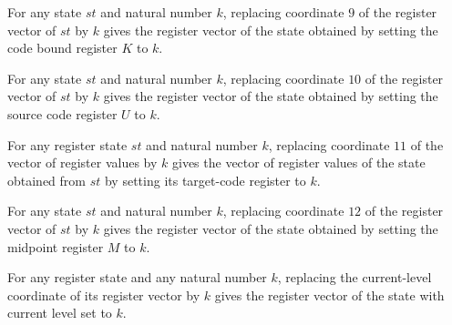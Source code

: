 \begin{lemma}
\label{Complexity.LogProg.SavitchARM.St.upd_K}
\leanok
{}
For any state $st$ and natural number $k$, replacing coordinate $9$ of the register
vector of $st$ by $k$ gives the register vector of the state obtained by setting the
code bound register $K$ to $k$.
\end{lemma}

\begin{lemma}
\label{Complexity.LogProg.SavitchARM.St.upd_U}
\leanok
{}
For any state $st$ and natural number $k$, replacing coordinate $10$ of the register
vector of $st$ by $k$ gives the register vector of the state obtained by setting the
source code register $U$ to $k$.
\end{lemma}

\begin{lemma}
\label{Complexity.LogProg.SavitchARM.St.upd_V}
\leanok
{}
For any register state $st$ and natural number $k$, replacing coordinate $11$ of the
vector of register values by $k$ gives the vector of register values of the state
obtained from $st$ by setting its target-code register to $k$.
\end{lemma}

\begin{lemma}
\label{Complexity.LogProg.SavitchARM.St.upd_M}
\leanok
{}
For any state $st$ and natural number $k$, replacing coordinate $12$ of the register
vector of $st$ by $k$ gives the register vector of the state obtained by setting the
midpoint register $M$ to $k$.
\end{lemma}

\begin{lemma}
\label{Complexity.LogProg.SavitchARM.St.upd_I}
\leanok
{}
For any register state and any natural number $k$, replacing the current-level
coordinate of its register vector by $k$ gives the register vector of the state with
current level set to $k$.
\end{lemma}

